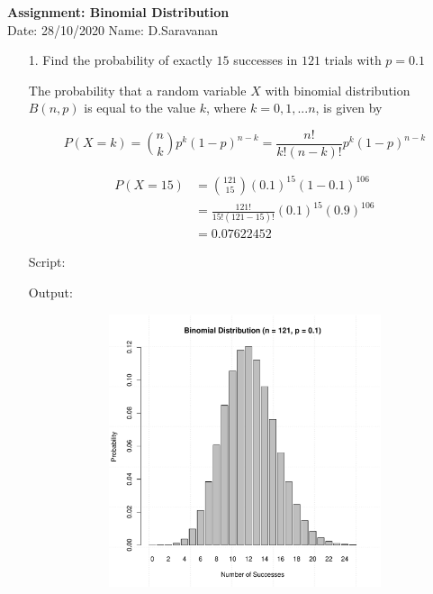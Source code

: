 \documentclass[a4paper,11pt,openright]{report}
\begin{document}
\singlespacing
\pagestyle{plain}

\begin{center}
\textbf{Assignment: Binomial Distribution} \\
Date: 28/10/2020 \hspace{2mm} Name: D.Saravanan
\end{center}

\vspace{10px}

\begin{enumerate}

\item[1.] Find the probability of exactly $15$ successes in $121$ trials with $p = 0.1$

The probability that a random variable $X$ with binomial distribution $B(n,p)$ is equal to
the value $k$, where $k = 0, 1,...n$, is given by

\begin{equation*}
P(X = k) = \binom nk p^{k} (1-p)^{n-k} = \frac{n!}{k! (n-k)!} p^{k} (1-p)^{n-k}
\end{equation*}

\begin{equation*}
\begin{split}
P(X = 15) & = \binom{121}{15} (0.1)^{15} (1-0.1)^{106} \\
& = \frac{121!}{15! (121-15)!} (0.1)^{15} (0.9)^{106} \\
& = 0.07622452
\end{split}
\end{equation*}

Script: 


Output:


\begin{figure}[ht!]
\includegraphics[width=16cm,height=8cm,keepaspectratio]{plot1.pdf}
\centering
\end{figure}


\end{enumerate}
\end{document}
